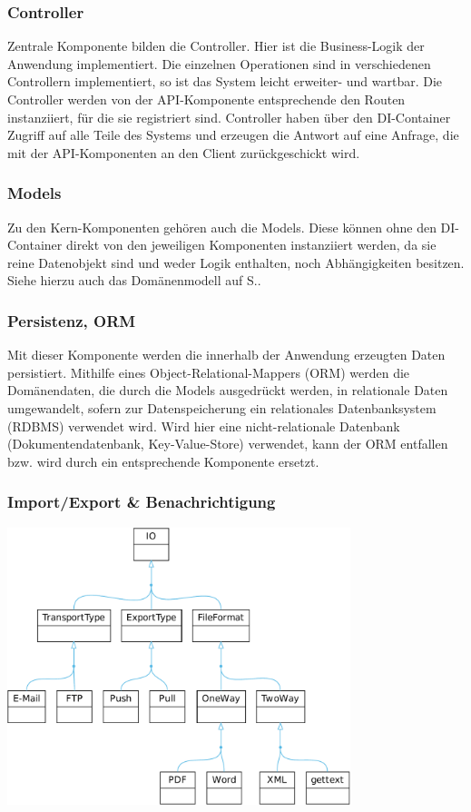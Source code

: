 \subsubsection{Controller}

Zentrale Komponente bilden die Controller. Hier ist die Business-Logik der Anwendung implementiert. Die einzelnen Operationen sind in verschiedenen Controllern implementiert, so ist das System leicht erweiter- und wartbar. Die Controller werden von der API-Komponente entsprechende den Routen instanziiert, für die sie registriert sind. Controller haben über den DI-Container Zugriff auf alle Teile des Systems und erzeugen die Antwort auf eine Anfrage, die mit der API-Komponenten an den Client zurückgeschickt wird.

\subsubsection{Models}

Zu den Kern-Komponenten gehören auch die Models. Diese können ohne den DI-Container direkt von den jeweiligen Komponenten instanziiert werden, da sie reine Datenobjekt sind und weder Logik enthalten, noch Abhängigkeiten besitzen. Siehe hierzu auch das Domänenmodell auf S.\pageref{l:domänenmodell}.

\subsubsection{Persistenz, ORM}

Mit dieser Komponente werden die innerhalb der Anwendung erzeugten Daten persistiert. Mithilfe eines Object-Relational-Mappers (ORM) werden die Domänendaten, die durch die Models ausgedrückt werden, in relationale Daten umgewandelt, sofern zur Datenspeicherung ein relationales Datenbanksystem (RDBMS) verwendet wird. Wird hier eine nicht-relationale Datenbank (Dokumentendatenbank, Key-Value-Store) verwendet, kann der ORM entfallen bzw. wird durch ein entsprechende Komponente ersetzt.

\subsubsection{Import/Export \& Benachrichtigung}

\begin{center}
\includegraphics[width=0.75\textwidth]{media/io.pdf}
\label{chart:io}
\end{center}

